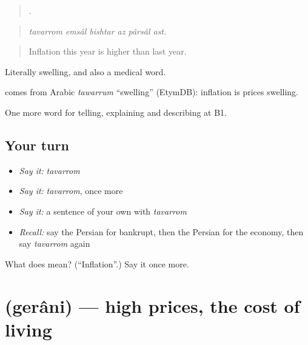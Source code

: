 \begin{quote}
     .
\end{quote}

\begin{quote}
\emph{tavarrom emsâl bishtar az pârsâl ast.}
\end{quote}

\begin{quote}
Inflation this year is higher than last year.
\end{quote}

Literally swelling, and also a medical word.

\begin{cousinweb}
\textbf{} comes from Arabic \emph{tawarrum} \textquotedblleft{}swelling\textquotedblright{} (EtymDB): inflation is prices swelling.
\end{cousinweb}

\begin{grammarlens}[title={What you've built}]
One more word for telling, explaining and describing at B1.
\end{grammarlens}

\subsection*{Your turn}
\begin{itemize}
\raggedright
  \item \emph{Say it:} \emph{tavarrom}
  \item \emph{Say it:} \emph{tavarrom}, once more
  \item \emph{Say it:} a sentence of your own with \emph{tavarrom}
  \item \emph{Recall:} say the Persian for bankrupt, then the Persian for the economy, then say \emph{tavarrom} again
\end{itemize}

\begin{tcolorbox}[breakable,colback=teal!4,colframe=teal!35!black,title={Before you move on}]
What does  mean? (\textquotedblleft{}Inflation\textquotedblright{}.) Say it once more.
\end{tcolorbox}
\section[\texorpdfstring{\fa{گرانی} (gerâni)}{گرانی (gerâni)}]{ (gerâni) — high prices, the cost of living}

